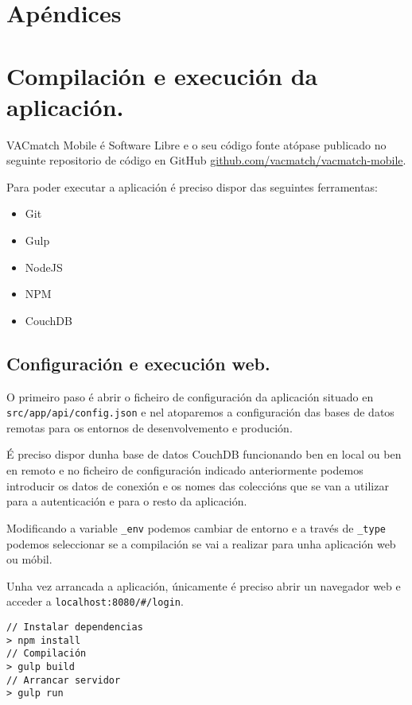 \newpage
\chapter*{Apéndices}
\thispagestyle{empty}
\newpage

\chapter{Compilación e execución da aplicación.}
\label{chap:compilacion_aplicacion}
VACmatch Mobile é Software Libre e o seu código fonte atópase publicado no 
seguinte repositorio de código en GitHub 
\href{https://github.com/vacmatch/vacmatch-mobile}{
github.com/vacmatch/vacmatch-mobile}.

Para poder executar a aplicación é preciso dispor das seguintes ferramentas:

\begin{itemize}
 \item Git
 \item Gulp
 \item NodeJS
 \item NPM
 \item CouchDB
\end{itemize}

  \section{Configuración e execución web.}

  O primeiro paso é abrir o ficheiro de configuración da aplicación situado en 
\lstinline{src/app/api/config.json} e nel atoparemos a configuración das bases 
de datos remotas para os entornos de desenvolvemento e produción.

  É preciso dispor dunha base de datos CouchDB funcionando ben en local ou ben 
en remoto e no ficheiro de configuración indicado anteriormente podemos 
introducir os datos de conexión e os nomes das coleccións que se van a 
utilizar para a autenticación e para o resto da aplicación.

  Modificando a variable \lstinline{_env} podemos cambiar de entorno e 
a través de \lstinline{_type} podemos seleccionar se a compilación se vai a 
realizar para unha aplicación web ou móbil.

  Unha vez arrancada a aplicación, únicamente é preciso abrir un 
navegador web e acceder a \lstinline{localhost:8080/#/login}.

      \lstset{}
      \begin{lstlisting}[caption=Configuración e execución web]
// Instalar dependencias
> npm install
// Compilación
> gulp build
// Arrancar servidor
> gulp run
      \end{lstlisting}

